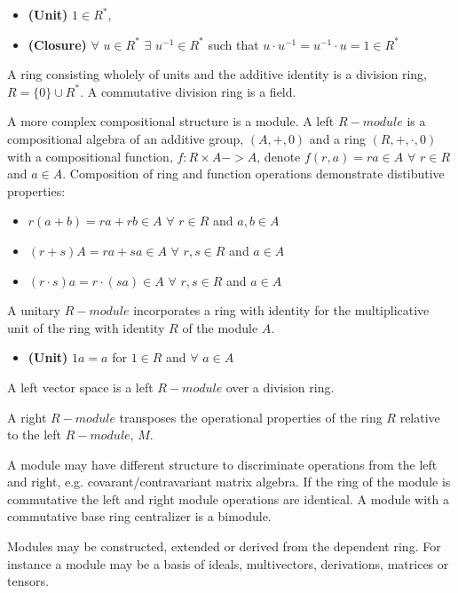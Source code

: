 \documentclass[aps,twocolumn,secnumarabic,nobalancelastpage,amsmath,amssymb,
amsthm,nofootinbib,parskip=full]{revtex4}
\begin{document}
\begin{itemize}
\item \textbf{\small (Unit)} $1\in R^*$, 
\item \textbf{\small (Closure)} $\forall$ $u\in R^*$ $\exists$ $u^{-1}\in R^*$
  such that $u\cdot u^{-1}=u^{-1}\cdot u=1\in R^*$
\end{itemize}

A ring consisting wholely of units and the additive identity is a division ring,
$R=\{0\}\cup R^*$. A commutative division ring is a field.

A more complex compositional structure is a module.
A left $R-module$ is a compositional algebra
of an additive group, $(A,+,0)$ and a ring $(R,+,\cdot,0)$
with a compositional function, $f{:}R\times A -> A$,
denote $f(r,a)=ra\in A$ $\forall$ $r\in R$ and $a\in A$.
Composition of ring and function operations demonstrate 
distibutive properties:

\begin{itemize}
\item $r(a+b)=ra + rb\in A$ $\forall$ $r\in R$ and $a,b\in A$
\item $(r+s)A=ra+sa\in A$ $\forall$ $r,s\in R$ and $a\in A$
\item $(r\cdot s)a=r\cdot (sa)\in A$ $\forall$ $r,s\in R$ and $a\in A$
\end{itemize}

A unitary $R-module$ incorporates a ring with identity for the multiplicative unit
of the ring with identity $R$ of the module $A$.

\begin{itemize}
\item \textbf{\small (Unit)} $1a=a$ for $1\in R$ and $\forall$ $a\in A$
\end{itemize}

A left vector space is a left $R-module$ over a division ring.

A right $R-module$ transposes the operational properties of the ring $R$
relative to the left $R-module$, $M$.

A module may have different structure to discriminate 
operations from the left and right, e.g. covarant/contravariant matrix algebra.
If the ring of the module is commutative the left and right module
operations are identical. A module with a commutative base ring centralizer
is a bimodule.

Modules may be constructed, extended or derived from the dependent ring. For instance
a module may be a basis of ideals, multivectors, derivations, matrices or tensors.
\end{document}

